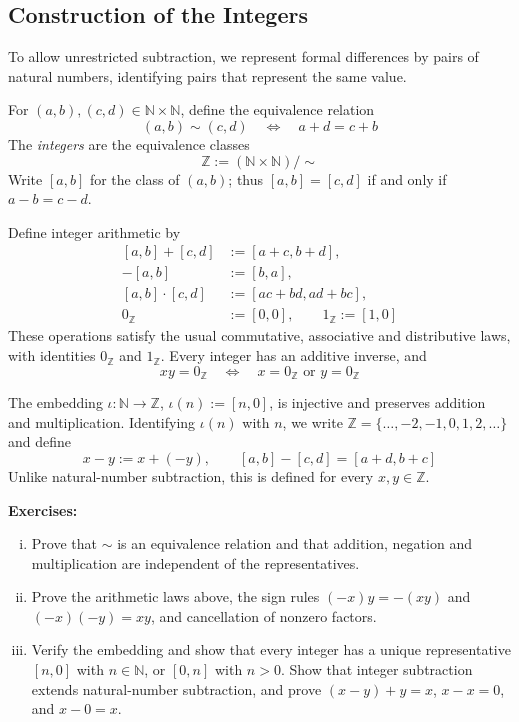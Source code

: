 \documentclass[a4paper,11pt,abstracton]{scrartcl}
\newcommand{\ZZ}{\mathbb{Z}}
\newcommand{\NN}{\mathbb{N}}
\theoremstyle{dotlessP}
\theoremstyle{dotlessS}
\theoremstyle{remark}
\theoremstyle{definition}
\begin{document}
\subsection{Construction of the Integers}
\label{subsec:integers}

To allow unrestricted subtraction, we represent formal differences by
pairs of natural numbers, identifying pairs that represent the same value.

\begin{definition_box}
For $(a,b),(c,d)\in\NN\times\NN$, define the equivalence relation
\[
    (a,b)\sim(c,d)\quad\Longleftrightarrow\quad a+d=c+b
\]
The \emph{integers} are the equivalence classes
\[
    \ZZ:=(\NN\times\NN)/\sim
\]
Write $[a,b]$ for the class of $(a,b)$; thus
$[a,b]=[c,d]$ if and only if $a-b=c-d$.
\end{definition_box}

Define integer arithmetic by
\[
\begin{aligned}
    [a,b]+[c,d]&:=[a+c,b+d],\\
    -[a,b]&:=[b,a],\\
    [a,b]\cdot[c,d]&:=[ac+bd,ad+bc],\\
    0_{\ZZ}&:=[0,0],\qquad 1_{\ZZ}:=[1,0]
\end{aligned}
\]
These operations satisfy the usual commutative, associative and
distributive laws, with identities $0_{\ZZ}$ and $1_{\ZZ}$.
Every integer has an additive inverse, and
\[
    xy=0_{\ZZ}\quad\Longleftrightarrow\quad x=0_{\ZZ}\text{ or }y=0_{\ZZ}
\]

The embedding $\iota:\NN\to\ZZ$, $\iota(n):=[n,0]$, is injective and
preserves addition and multiplication. Identifying $\iota(n)$ with $n$,
we write $\ZZ=\{\ldots,-2,-1,0,1,2,\ldots\}$ and define
\[
    x-y:=x+(-y),\qquad [a,b]-[c,d]=[a+d,b+c]
\]
Unlike natural-number subtraction, this is defined for every $x,y\in\ZZ$.

\textbf{Exercises:}
\begin{enumerate}[(i)]
    \item Prove that $\sim$ is an equivalence relation and that addition,
    negation and multiplication are independent of the representatives.
    \item Prove the arithmetic laws above, the sign rules
    $(-x)y=-(xy)$ and $(-x)(-y)=xy$, and cancellation of nonzero factors.
    \item Verify the embedding and show that every integer has a unique
    representative $[n,0]$ with $n\in\NN$, or $[0,n]$ with $n>0$.
    Show that integer subtraction extends natural-number subtraction,
    and prove $(x-y)+y=x$, $x-x=0$, and $x-0=x$.
\end{enumerate}
\end{document}
